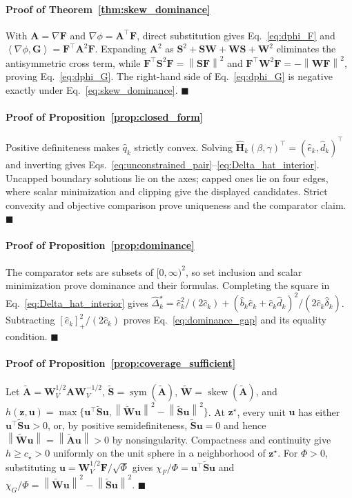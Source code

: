 \documentclass[journal]{IEEEtran}
\theoremstyle{remark}
\newcommand{\inner}[2]{\left\langle #1,#2\right\rangle}
\newcommand{\norm}[1]{\left\lVert #1\right\rVert}
\newcommand{\sym}{\operatorname{sym}}
\newcommand{\skewop}{\operatorname{skew}}
\newcommand{\bz}{\boldsymbol{z}}
\newcommand{\bu}{\boldsymbol{u}}
\newcommand{\bH}{\boldsymbol{H}}
\newcommand{\bW}{\boldsymbol{W}}
\newcommand{\bS}{\boldsymbol{S}}
\newcommand{\bA}{\boldsymbol{A}}
\newcommand{\bF}{\boldsymbol{F}}
\newcommand{\bG}{\boldsymbol{G}}
\begin{document}
	\paragraph{Proof of Theorem~\ref{thm:skew_dominance}}\label{app:skew_dominance}
	With $\bA=\nabla\bF$ and $\nabla\phi=\bA^\top\bF$, direct substitution gives Eq.~\eqref{eq:dphi_F} and $\inner{\nabla\phi}{\bG}=\bF^\top\bA^2\bF$.
	Expanding $\bA^2$ as $\bS^2+\bS\bW+\bW\bS+\bW^2$ eliminates the antisymmetric cross term, while $\bF^\top\bS^2\bF=\norm{\bS\bF}^2$ and $\bF^\top\bW^2\bF=-\norm{\bW\bF}^2$, proving Eq.~\eqref{eq:dphi_G}.
	The right-hand side of Eq.~\eqref{eq:dphi_G} is negative exactly under Eq.~\eqref{eq:skew_dominance}.
	\hfill$\blacksquare$
	
	\paragraph{Proof of Proposition~\ref{prop:closed_form}}\label{app:closed_form}
	Positive definiteness makes $\hat q_k$ strictly convex. Solving $\widehat{\bH}_k(\beta,\gamma)^\top=(\hat e_k,\hat d_k)^\top$ and inverting gives Eqs.~\eqref{eq:unconstrained_pair}--\eqref{eq:Delta_hat_interior}. Uncapped boundary solutions lie on the axes; capped ones lie on four edges, where scalar minimization and clipping give the displayed candidates. Strict convexity and objective comparison prove uniqueness and the comparator claim.
	\hfill$\blacksquare$
	
	\paragraph{Proof of Proposition~\ref{prop:dominance}}\label{app:dominance}
	The comparator sets are subsets of $[0,\infty)^2$, so set inclusion and scalar minimization prove dominance and their formulas.
	Completing the square in Eq.~\eqref{eq:Delta_hat_interior} gives $\widehat\Delta_k^\star=\hat e_k^2/(2\hat c_k)+ (\hat b_k\hat e_k+\hat c_k\hat d_k)^2/(2\hat c_k\hat\delta_k)$.
	Subtracting $[\hat e_k]_+^2/(2\hat c_k)$ proves Eq.~\eqref{eq:dominance_gap} and its equality condition.
	\hfill$\blacksquare$
	
	\paragraph{Proof of Proposition~\ref{prop:coverage_sufficient}}\label{app:coverage_sufficient}
	Let $\widetilde{\bA}=\bW_V^{1/2}\bA\bW_V^{-1/2}$, $\widetilde{\bS}=\sym(\widetilde{\bA})$, $\widetilde{\bW}=\skewop(\widetilde{\bA})$, and $h(\bz,\bu)=\max\{\bu^\top\widetilde{\bS}\bu,\norm{\widetilde{\bW}\bu}^2-\norm{\widetilde{\bS}\bu}^2\}$.
	At $\bz^\star$, every unit $\bu$ has either $\bu^\top\widetilde{\bS}\bu>0$, or, by positive semidefiniteness, $\widetilde{\bS}\bu=0$ and hence $\norm{\widetilde{\bW}\bu}=\norm{\widetilde{\bA}\bu}>0$ by nonsingularity. Compactness and continuity give $h\ge c_\star>0$ uniformly on the unit sphere in a neighborhood of $\bz^\star$. For $\Phi>0$, substituting $\bu=\bW_V^{1/2}\bF/\sqrt{\Phi}$ gives $\chi_F/\Phi=\bu^\top\widetilde{\bS}\bu$ and $\chi_G/\Phi=\norm{\widetilde{\bW}\bu}^{2}-\norm{\widetilde{\bS}\bu}^{2}$.
	\hfill$\blacksquare$
	
\end{document}
